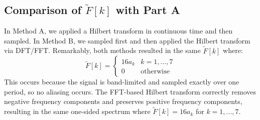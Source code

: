 \documentclass{article}
\begin{document}
\subsection*{Comparison of \(\tilde{F}[k]\) with Part A}
In Method A, we applied a Hilbert transform in continuous time and then sampled. In Method B, we sampled first and then applied the Hilbert transform via DFT/FFT. Remarkably, both methods resulted in the same \(\tilde{F}[k]\) where:
\[
\tilde{F}[k] = \begin{cases}
    16a_k & k =1,...,7 \\
    0 & \text{otherwise}
\end{cases}
\]
This occurs because the signal is band-limited and sampled exactly over one period, so no aliasing occurs. The FFT-based Hilbert transform correctly removes negative frequency components and preserves positive frequency components, resulting in the same one-sided spectrum where \(\tilde{F}[k] = 16a_k\) for \(k=1,...,7\). 
\end{document}
